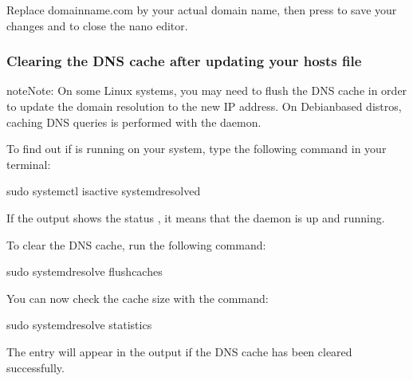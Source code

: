 \documentclass[a4paper,10pt,english,openany,oneside]{sphinxmanual}
\begin{document}
\sphinxAtStartPar
Replace domainname.com by your actual domain name, then press  to save your changes and  to close the nano editor.


\subsubsection{Clearing the DNS cache after updating your hosts file}
\label{\detokenize{joomla-to-vps:clearing-the-dns-cache-after-updating-your-hosts-file}}
\begin{sphinxadmonition}{note}{Note:}
\sphinxAtStartPar
On some Linux systems, you may need to flush the DNS cache in order to update the domain resolution to the new IP address. On Debian\sphinxhyphen{}based distros, caching DNS queries is performed with the  daemon.
\end{sphinxadmonition}

\sphinxAtStartPar
To find out if  is running on your system, type the following command in your terminal:

\begin{sphinxVerbatim}[commandchars=\\\{\}]
\PYGZdl{} sudo systemctl is\PYGZhy{}active systemd\PYGZhy{}resolved
\end{sphinxVerbatim}

\sphinxAtStartPar
If the output shows the status , it means that the daemon is up and running.

\sphinxAtStartPar
To clear the DNS cache, run the following command:

\begin{sphinxVerbatim}[commandchars=\\\{\}]
\PYGZdl{} sudo systemd\PYGZhy{}resolve \PYGZhy{}\PYGZhy{}flush\PYGZhy{}caches
\end{sphinxVerbatim}

\sphinxAtStartPar
You can now check the cache size with the command:

\begin{sphinxVerbatim}[commandchars=\\\{\}]
\PYGZdl{} sudo systemd\PYGZhy{}resolve \PYGZhy{}\PYGZhy{}statistics
\end{sphinxVerbatim}

\sphinxAtStartPar
The entry  will appear in the output if the DNS cache has been cleared successfully.
\end{document}
